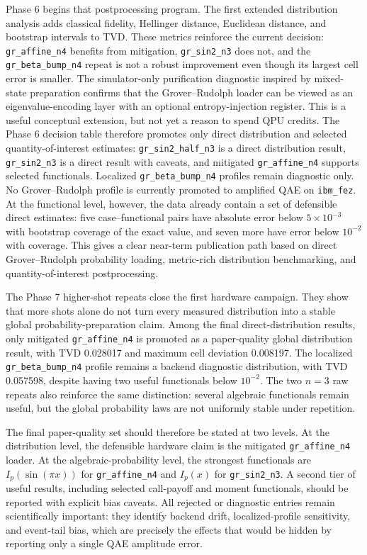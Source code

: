 Phase 6 begins that postprocessing program. The first extended distribution
analysis adds classical fidelity, Hellinger distance, Euclidean distance, and
bootstrap intervals to TVD. These metrics reinforce the current decision:
\texttt{gr\_affine\_n4} benefits from mitigation, \texttt{gr\_sin2\_n3} does
not, and the \texttt{gr\_beta\_bump\_n4} repeat is not a robust improvement even
though its largest cell error is smaller. The simulator-only purification
diagnostic inspired by mixed-state preparation confirms that the
Grover--Rudolph loader can be viewed as an eigenvalue-encoding layer with an
optional entropy-injection register. This is a useful conceptual extension, but
not yet a reason to spend QPU credits. The Phase 6 decision table therefore
promotes only direct distribution and selected quantity-of-interest estimates:
\texttt{gr\_sin2\_half\_n3} is a direct distribution result,
\texttt{gr\_sin2\_n3} is a direct result with caveats, and mitigated
\texttt{gr\_affine\_n4} supports selected functionals. Localized
\texttt{gr\_beta\_bump\_n4} profiles remain diagnostic only. No
Grover--Rudolph profile is currently promoted to amplified QAE on
\texttt{ibm\_fez}. At the functional level, however, the data already contain a
set of defensible direct estimates: five case--functional pairs have absolute
error below \(5\times 10^{-3}\) with bootstrap coverage of the exact value, and
seven more have error below \(10^{-2}\) with coverage. This gives a clear
near-term publication path based on direct Grover--Rudolph probability loading,
metric-rich distribution benchmarking, and quantity-of-interest postprocessing.

The Phase 7 higher-shot repeats close the first hardware campaign. They show
that more shots alone do not turn every measured distribution into a stable
global probability-preparation claim. Among the final direct-distribution
results, only mitigated \texttt{gr\_affine\_n4} is promoted as a
paper-quality global distribution result, with TVD 0.028017 and maximum cell
deviation 0.008197. The localized \texttt{gr\_beta\_bump\_n4} profile remains a
backend diagnostic distribution, with TVD 0.057598, despite having two useful
functionals below \(10^{-2}\). The two \(n=3\) raw repeats also reinforce the
same distinction: several algebraic functionals remain useful, but the global
probability laws are not uniformly stable under repetition.

The final paper-quality set should therefore be stated at two levels. At the
distribution level, the defensible hardware claim is the mitigated
\texttt{gr\_affine\_n4} loader. At the algebraic-probability level, the strongest
functionals are \(I_p(\sin(\pi x))\) for \texttt{gr\_affine\_n4} and \(I_p(x)\)
for \texttt{gr\_sin2\_n3}. A second tier of useful results, including selected
call-payoff and moment functionals, should be reported with explicit bias
caveats. All rejected or diagnostic entries remain scientifically important:
they identify backend drift, localized-profile sensitivity, and event-tail
bias, which are precisely the effects that would be hidden by reporting only a
single QAE amplitude error.

